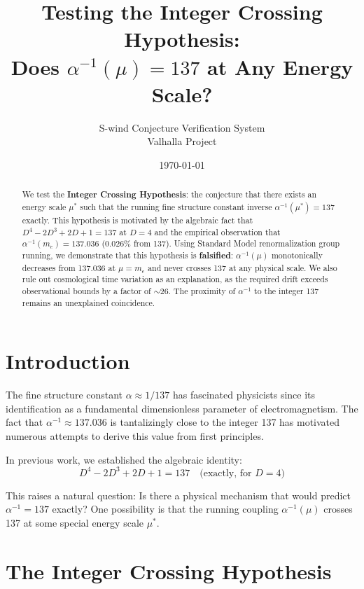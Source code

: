 \documentclass[11pt,a4paper]{article}
\title{Testing the Integer Crossing Hypothesis:\\Does $\alpha^{-1}(\mu) = 137$ at Any Energy Scale?}
\author{S-wind Conjecture Verification System\\Valhalla Project}
\date{\today}
\begin{document}
\maketitle

\begin{abstract}
We test the \textbf{Integer Crossing Hypothesis}: the conjecture that there exists an energy scale $\mu^*$ such that the running fine structure constant inverse $\alpha^{-1}(\mu^*) = 137$ exactly. This hypothesis is motivated by the algebraic fact that $D^4 - 2D^3 + 2D + 1 = 137$ at $D=4$ and the empirical observation that $\alpha^{-1}(m_e) = 137.036$ (0.026\% from 137). Using Standard Model renormalization group running, we demonstrate that this hypothesis is \textbf{falsified}: $\alpha^{-1}(\mu)$ monotonically decreases from 137.036 at $\mu = m_e$ and never crosses 137 at any physical scale. We also rule out cosmological time variation as an explanation, as the required drift exceeds observational bounds by a factor of $\sim 26$. The proximity of $\alpha^{-1}$ to the integer 137 remains an unexplained coincidence.
\end{abstract}

\section{Introduction}

The fine structure constant $\alpha \approx 1/137$ has fascinated physicists since its identification as a fundamental dimensionless parameter of electromagnetism. The fact that $\alpha^{-1} \approx 137.036$ is tantalizingly close to the integer 137 has motivated numerous attempts to derive this value from first principles.

In previous work, we established the algebraic identity:
\begin{equation}
D^4 - 2D^3 + 2D + 1 = 137 \quad \text{(exactly, for } D=4\text{)}
\end{equation}

This raises a natural question: Is there a physical mechanism that would predict $\alpha^{-1} = 137$ exactly? One possibility is that the running coupling $\alpha^{-1}(\mu)$ crosses 137 at some special energy scale $\mu^*$.

\section{The Integer Crossing Hypothesis}
\end{document}
